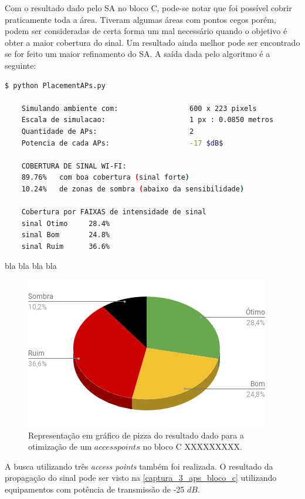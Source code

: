 \documentclass[
	12pt,				%
	twoside,			%
	a4paper,			%
	english,			%
	french,				%
	spanish,			%
	brazil				%
	]{abntex2}
\begin{document}
Com o resultado dado pelo SA no bloco C, pode-se notar que foi possível
cobrir praticamente toda a área. Tiveram algumas áreas com pontos cegos
porém, podem ser consideradas de certa forma um mal necessário quando o
objetivo é obter a maior cobertura do sinal. Um resultado ainda melhor
pode ser encontrado se for feito um maior refinamento do SA. A saída
dada pelo algoritmo é a seguinte:

\begin{lstlisting}[language=bash]
    $ python PlacementAPs.py 
    
    Simulando ambiente com:                 600 x 223 pixels
    Escala de simulacao:                    1 px : 0.0850 metros
    Quantidade de APs:                      2
    Potencia de cada APs:                   -17 $dB$
    
    COBERTURA DE SINAL WI-FI:
    89.76%   com boa cobertura (sinal forte)
    10.24%   de zonas de sombra (abaixo da sensibilidade)
    
    Cobertura por FAIXAS de intensidade de sinal
    sinal Otimo     28.4%
    sinal Bom       24.8%
    sinal Ruim      36.6%
\end{lstlisting}

bla bla bla bla

\begin{figure}[ht]
    \caption{\label{percent_bloco_c_2} Representação em gráfico de pizza do resultado dado para a otimização 
     de um $access points$ no bloco C XXXXXXXXX. }
    \begin{center}
        \includegraphics[scale=0.7]{imagens/percent-bloco-c-2.png}
    \end{center}
\end{figure}

A busca utilizando três \emph{access points} também foi realizada. O
resultado da propagação do sinal pode ser visto na
\autoref{captura_3_aps_bloco_c} utilizando equipamentos com potência de
transmissão de -25 \(dB\).
\end{document}
